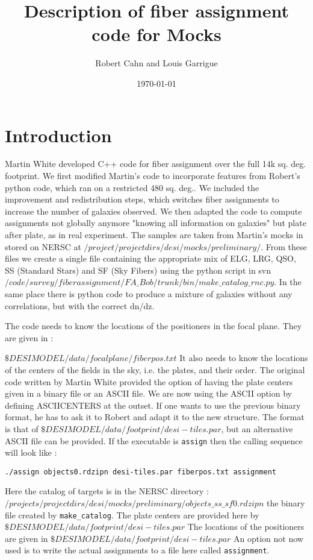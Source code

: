 \documentclass{article}
\title{Description of fiber assignment code for Mocks}
\author{Robert Cahn and Louis Garrigue}
\date{\today}
\begin{document}
\maketitle

\section{Introduction}

Martin White developed C++ code for fiber assignment over the full 14k sq. deg. footprint.  We first modified Martin's code to incorporate features from Robert's python code, which ran on a restricted 480 sq. deg.. We included the improvement and redistribution steps, which switches fiber assignments to increase the number of galaxies observed. We then adapted the code to compute assignments not globally anymore "knowing all information on galaxies" but plate after plate, as in real experiment.
The samples are taken from Martin's mocks in stored on NERSC at $/project/projectdirs/desi/mocks/preliminary/$.  From these files we create a single file containing the appropriate mix of ELG, LRG, QSO, SS (Standard Stars) and SF (Sky Fibers) using the python script in svn $/code/survey/fiberassignment/FA\_Bob/trunk/bin/make\_catalog\_rnc.py$.  In the same place there is python code to produce a mixture of galaxies without any correlations, but with the correct dn/dz.  
  
  The code needs to know the locations of the positioners in the focal plane.  They are given in :
  
  $ \$DESIMODEL/data/focalplane/fiberpos.txt$
  It also needs to know the locations of the centers of the fields in the sky, i.e. the plates, and their order.  The original code written by Martin White provided the option of having the plate centers given in a binary file or an ASCII file.  We are now using the ASCII option by defining ASCIICENTERS at the outset.  If one wants to use the previous binary format, he has to ask it to Robert and adapt it to the new structure. The format is that of $\$DESIMODEL/data/footprint/desi-tiles.par$, but an alternative ASCII file can be provided. If the executable is {\tt assign} then the calling sequence will look like :
  
  {\tt./assign objects0.rdzipn desi-tiles.par fiberpos.txt assignment}
 
 Here the catalog of targets is in the NERSC directory :
  $/projects/projectdirs/desi/mocks/preliminary/objects\_ss\_sf0.rdzipn$ the binary file created by {\tt make\_catalog}.  The plate centers are provided here by  $\$DESIMODEL/data/footprint/desi-tiles.par$    The locations of the positioners are given in $ \$DESIMODEL/data/footprint/desi-tiles.par$  An option not now used is to write the actual assignments to a file here called {\tt assignment}.
  
\end{document}
